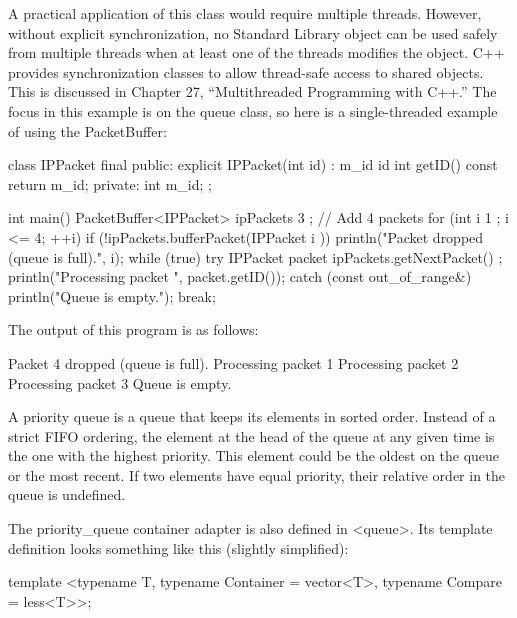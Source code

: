 A practical application of this class would require multiple threads. However, without explicit synchronization, no Standard Library object can be used safely from multiple threads when at least one of the threads modifies the object. C++ provides synchronization classes to allow thread-safe access to shared objects. This is discussed in Chapter 27, “Multithreaded Programming with C++.” The focus in this example is on the queue class, so here is a single-threaded example of using the PacketBuffer:


\begin{cpp}
class IPPacket final
{
    public:
        explicit IPPacket(int id) : m_id { id } {}
        int getID() const { return m_id; }
    private:
        int m_id;
};

int main()
{
    PacketBuffer<IPPacket> ipPackets { 3 };
    // Add 4 packets
    for (int i { 1 }; i <= 4; ++i) {
        if (!ipPackets.bufferPacket(IPPacket { i })) {
            println("Packet {} dropped (queue is full).", i);
        }
    }
    while (true) {
        try {
            IPPacket packet { ipPackets.getNextPacket() };
            println("Processing packet {}", packet.getID());
        } catch (const out_of_range&) {
            println("Queue is empty.");
            break;
        }
    }
}
\end{cpp}

The output of this program is as follows:

\begin{shell}
Packet 4 dropped (queue is full).
Processing packet 1
Processing packet 2
Processing packet 3
Queue is empty.
\end{shell}


A priority queue is a queue that keeps its elements in sorted order. Instead of a strict FIFO ordering, the element at the head of the queue at any given time is the one with the highest priority. This element could be the oldest on the queue or the most recent. If two elements have equal priority, their relative order in the queue is undefined.

The priority\_queue container adapter is also defined in <queue>. Its template definition looks something like this (slightly simplified):

\begin{cpp}
template <typename T, typename Container = vector<T>,
          typename Compare = less<T>>;
\end{cpp}

